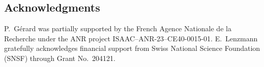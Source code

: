 \documentclass[10pt,reqno,a4paper]{amsart}
\theoremstyle{definition}
\theoremstyle{remark}
\theoremstyle{remark}
\numberwithin{equation}{section}
\newcommand{\C}{\mathbb{C}}
\newcommand{\R}{\mathbb{R}}
\newcommand{\T}{\mathbb{T}}
\newcommand{\D}{\mathbb{D}}
\newcommand{\Ss}{\mathbb{S}}
\newcommand{\ov}{\overline}
\newcommand{\be}{\begin{equation}}
\newcommand{\ee}{\end{equation}}
\newcommand{\eu}{\mathrm{e}}
\newcommand{\uu}{\mathbf{u}}
\newcommand{\Gr}{\mathsf{Gr}}
\renewcommand{\phi}{\varphi}
\newcommand{\Qb}{\mathbf{Q}}
\begin{document}
\subsection*{Acknowledgments}
P.~G\'erard was partially supported by the French Agence Nationale de la Recherche under the ANR project ISAAC–ANR-23–CE40-0015-01. E.~Lenzmann gratefully acknowledges financial support from Swiss National Science Foundation (SNSF) through Grant No.~204121.
%


%
\end{document}
